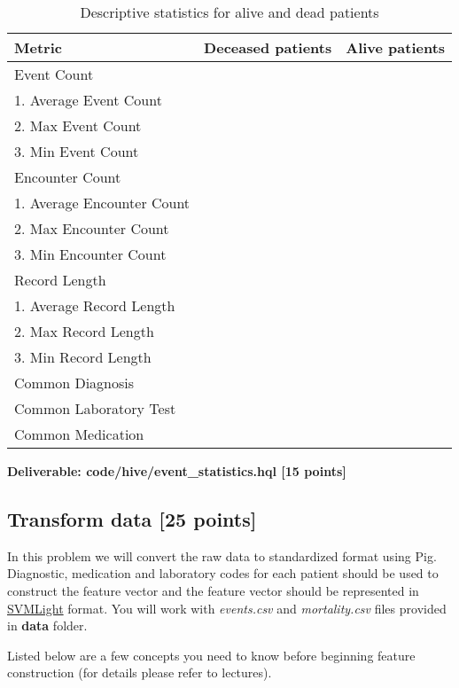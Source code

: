 \documentclass[12pt]{article}
\begin{document}
\begin{table}[th]
\centering
\begin{tabular}{@{}l|l|l}
\toprule
Metric & Deceased patients & Alive patients  \\ \hline
Event Count & &  \\ 
1. Average Event Count && \\
2. Max Event Count  &&\\
3. Min Event Count  &&\\ \hline

Encounter Count & &  \\ 
1. Average Encounter Count  &&\\
2. Max Encounter Count  &&\\
3. Min Encounter Count  &&\\ \hline

Record Length & &  \\ 
1. Average Record Length &&\\
2. Max Record Length&& \\
3. Min Record Length&& \\ \hline

Common Diagnosis & &  \\ \hline

Common Laboratory Test & &  \\ \hline

Common Medication & &  \\ 
\bottomrule
\end{tabular}
\caption{Descriptive statistics for alive and dead patients}
\label{tbl:stat}
\end{table} 

\textbf{Deliverable: code/hive/event\_statistics.hql [15 points]}

\subsection{Transform data [25 points]}
In this problem we will convert the raw data to standardized format using Pig. Diagnostic, medication and laboratory codes for each patient should be used to construct the feature vector and the feature vector should be represented in \href{http://svmlight.joachims.org/}{SVMLight} format. You will work with \textit{events.csv} and \textit{mortality.csv} files provided in \textbf{data} folder. 

Listed below are a few concepts you need to know before beginning feature construction (for details please refer to lectures). 
\end{document}
